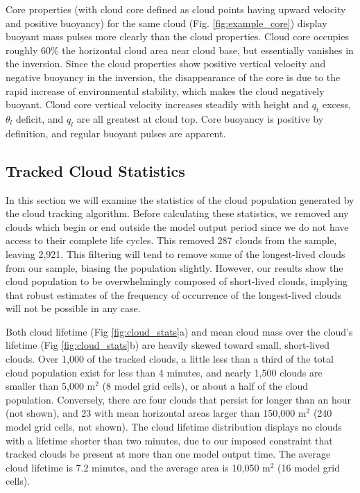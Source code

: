 \documentclass[acp]{copernicus}
\begin{document}
Core properties (with cloud core defined as cloud points having upward velocity
and positive buoyancy) for the same cloud (Fig. \ref{fig:example_core}) 
display buoyant mass pulses more clearly than the cloud properties.  Cloud core 
occupies roughly 60\% the horizontal cloud area near cloud base, but 
essentially vanishes in the inversion.  Since the cloud properties show 
positive vertical velocity and negative buoyancy in the inversion, the 
disappearance of the core is due to the rapid increase of environmental 
stability, which makes the cloud negatively buoyant.  Cloud core vertical 
velocity increases steadily with height and $q_t$ excess, $\theta_l$ deficit, 
and $q_l$ are all greatest at cloud top.  Core buoyancy is positive by 
definition, and regular buoyant pulses are apparent.

\subsection{Tracked Cloud Statistics}

In this section we will examine the statistics of the cloud population 
generated by the cloud tracking algorithm.  Before calculating these 
statistics, we removed any clouds which begin or end outside the model output
period since we do not have access to their complete life cycles. This removed 
287 clouds from the sample, leaving 2,921.  This filtering will tend to remove 
some of the longest-lived clouds from our sample, biasing the population 
slightly.  However, our results show the cloud population to be overwhelmingly 
composed of short-lived clouds, implying that robust estimates of the frequency 
of occurrence of the longest-lived clouds will not be possible in any case.

Both cloud lifetime (Fig \ref{fig:cloud_stats}a) and mean cloud mass over the 
cloud's lifetime (Fig \ref{fig:cloud_stats}b) are heavily skewed toward small, 
short-lived clouds.  Over 1,000 of the tracked clouds, a little less than a 
third of the total cloud population exist for less than 4 minutes, and nearly 
1,500 clouds are smaller than 5,000 m$^2$ (8 model grid cells), or about a half 
of the cloud population.  Conversely, there are four clouds that persist for 
longer than an hour (not shown), and 23 with mean horizontal areas larger than 
150,000 m$^2$ (240 model grid cells, not shown).  The cloud lifetime 
distribution displays no clouds with a lifetime shorter than two minutes, due 
to our imposed constraint that tracked clouds be present at more than one model 
output time.  The average cloud lifetime is 7.2 minutes, and the average area 
is 10,050 m$^2$ (16 model grid cells).
\end{document}
